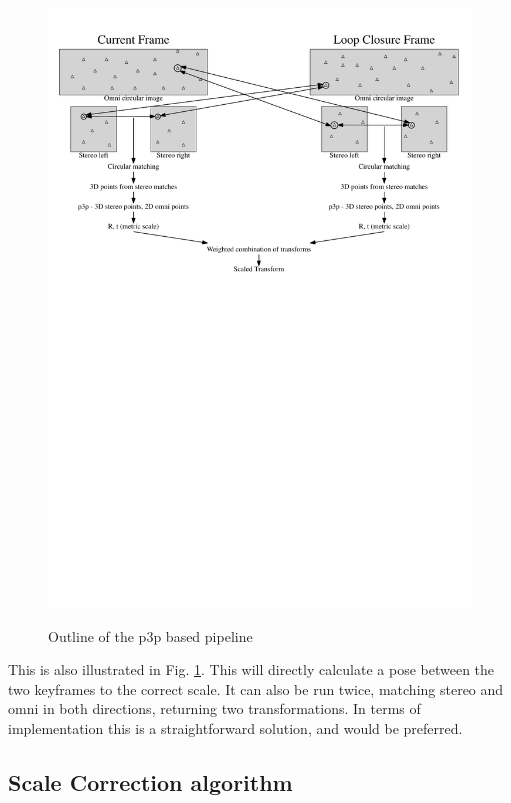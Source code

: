 \begin{figure}[h]
  \centering
    \includegraphics[width=1.0\textwidth]{chapters/images/6_images_p3p}\\
  \caption{Outline of the p3p based pipeline}
  \label{fig:p3p_flowchart}
\end{figure}

This is also illustrated in Fig. \ref{fig:p3p_flowchart}.  This will directly calculate a pose between the two keyframes to the correct scale.  It can also be run twice, matching stereo and omni in both directions, returning two transformations. In terms of implementation this is a straightforward solution, and would be preferred.  

\subsection{Scale Correction algorithm}

